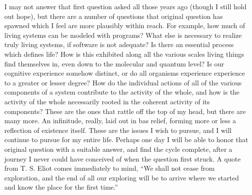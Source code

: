 I may not answer that first question asked all those years ago (though I still hold out hope), but there are a number of questions that original question has spawned which I feel are more plausibly within reach. For example, how much of living systems can be modeled with programs? What else is necessary to realize truly living systems, if software is not adequate? Is there an essential process which defines life? How is this exhibited along all the various scales living things find themselves in, even down to the molecular and quantum level? Is our cognitive experience somehow distinct, or do all organisms experience experience to a greater or lesser degree? How do the individual actions of all of the various components of a system contribute to the activity of the whole, and how is the activity of the whole necessarily rooted in the coherent activity of its components? These are the ones that rattle off the top of my head, but there are many more. An infinitude, really, laid out in bas relief, forming more or less a reflection of existence itself. These are the issues I wish to pursue, and I will continue to pursue for my entire life. Perhaps one day I will be able to honor that original question with a suitable answer, and find the cycle complete, after a journey I never could have conceived of when the question first struck. A quote from T. S. Eliot comes immediately to mind, ``We shall not cease from exploration, and the end of all our exploring will be to arrive where we started and know the place for the first time.''
